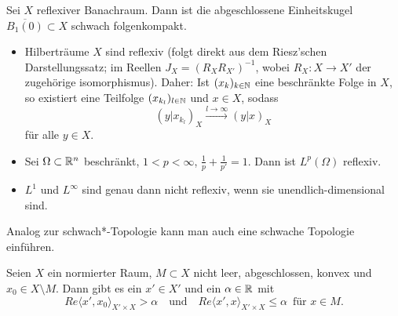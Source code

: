 \documentclass{cheat-sheet}
\begin{document}
\begin{satz}
  Sei $X$ reflexiver Banachraum. Dann ist die abgeschlossene Einheitskugel $\overline{B_1(0)} \subset X$ schwach folgenkompakt.
\end{satz}

\begin{bsp}
  \begin{itemize}
    \item Hilberträume $X$ sind reflexiv (folgt direkt aus dem Riesz'schen Darstellungssatz; im Reellen $J_X = (R_X R_{X'})^{-1}$, wobei $R_X : X \to X'$ der zugehörige isomorphismus). Daher: Ist $(x_k)_{k \in \mathbb{N}}$ eine beschränkte Folge in $X$, so existiert eine Teilfolge $(x_{k_l})_{l \in \mathbb{N}}$ und $x \in X$, sodass
    \[ (y | x_{k_l})_X \xrightarrow{l \to \infty} (y | x)_X \]
    für alle $y \in X$.
    \item Sei $\Omega \subset \mathbb{R}^n$ beschränkt, $1 < p < \infty$, $\tfrac{1}{p} + \tfrac{1}{p'} = 1$. Dann ist $L^p(\Omega)$ reflexiv.
    \item $L^1$ und $L^\infty$ sind genau dann nicht reflexiv, wenn sie unendlich-dimensional sind.
  \end{itemize}
\end{bsp}

\begin{bem}
  Analog zur schwach*-Topologie kann man auch eine schwache Topologie einführen.
\end{bem}




\begin{satz}[Trennungssatz]
  Seien $X$ ein normierter Raum, $M \subset X$ nicht leer, abgeschlossen, konvex und $x_0 \in X \setminus M$. Dann gibt es ein $x' \in X'$ und ein $\alpha \in \mathbb{R}$ mit
  \[ Re \langle x', x_0 \rangle_{X' \times X} > \alpha \quad \text{und} \quad Re \langle x', x \rangle_{X' \times X} \leq \alpha \enspace \text{für } x \in M. \]
\end{satz}


\end{document}
